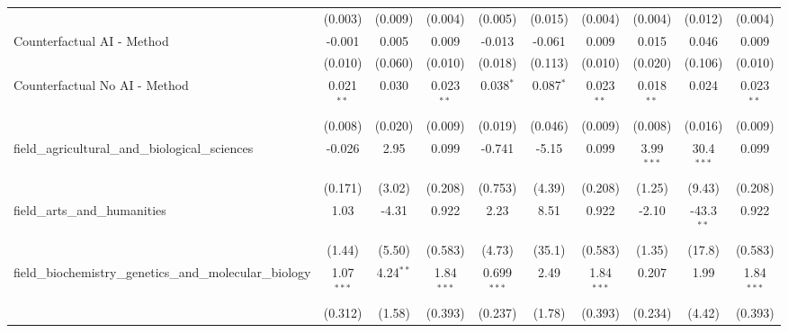 \begin{tabular}{lccccccccc}
                                                               & (0.003)        & (0.009)        & (0.004)       & (0.005)       & (0.015)        & (0.004)       & (0.004)        & (0.012)       & (0.004)\\   
   Counterfactual AI - Method                                  & -0.001         & 0.005          & 0.009         & -0.013        & -0.061         & 0.009         & 0.015          & 0.046         & 0.009\\   
                                                               & (0.010)        & (0.060)        & (0.010)       & (0.018)       & (0.113)        & (0.010)       & (0.020)        & (0.106)       & (0.010)\\   
   Counterfactual No AI - Method                               & 0.021$^{**}$   & 0.030          & 0.023$^{**}$  & 0.038$^{*}$   & 0.087$^{*}$    & 0.023$^{**}$  & 0.018$^{**}$   & 0.024         & 0.023$^{**}$\\   
                                                               & (0.008)        & (0.020)        & (0.009)       & (0.019)       & (0.046)        & (0.009)       & (0.008)        & (0.016)       & (0.009)\\   
   field\_agricultural\_and\_biological\_sciences              & -0.026         & 2.95           & 0.099         & -0.741        & -5.15          & 0.099         & 3.99$^{***}$   & 30.4$^{***}$  & 0.099\\   
                                                               & (0.171)        & (3.02)         & (0.208)       & (0.753)       & (4.39)         & (0.208)       & (1.25)         & (9.43)        & (0.208)\\   
   field\_arts\_and\_humanities                                & 1.03           & -4.31          & 0.922         & 2.23          & 8.51           & 0.922         & -2.10          & -43.3$^{**}$  & 0.922\\   
                                                               & (1.44)         & (5.50)         & (0.583)       & (4.73)        & (35.1)         & (0.583)       & (1.35)         & (17.8)        & (0.583)\\   
   field\_biochemistry\_genetics\_and\_molecular\_biology      & 1.07$^{***}$   & 4.24$^{**}$    & 1.84$^{***}$  & 0.699$^{***}$ & 2.49           & 1.84$^{***}$  & 0.207          & 1.99          & 1.84$^{***}$\\   
                                                               & (0.312)        & (1.58)         & (0.393)       & (0.237)       & (1.78)         & (0.393)       & (0.234)        & (4.42)        & (0.393)\\   

\end{tabular}

